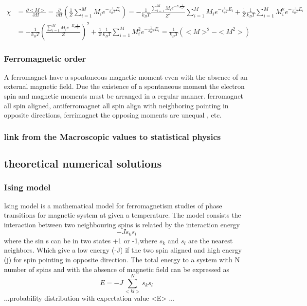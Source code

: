 \documentclass[10pt,a4paper]{article}
\begin{document}
\begin{align}
\chi &=\frac{\partial <M>}{\partial H} = \frac{\partial}{\partial H} \left( \frac{1}{Z }\sum_{i=1}^{M}M_i e ^{ - \frac {1}{k_BT} E_i}\right) = -\frac{1}{k_B T } \frac{\sum_{i=1}^{M} M_i e^{-E_i \frac{1}{k_BT}}}{ Z^2}\sum_{i=1}^{M}M_i e ^{ - \frac {1}{k_BT} E_i} +\frac{1}{Z}\frac{1}{k_BT}\sum_{i=1}^{M}M_i^2 e ^{ - \frac {1}{k_BT} E_i} \\
 &= -\frac{1}{k_B T} \left( \frac{\sum_{i=1}^{M} M_i e^{-E_i \frac{1}{k_BT}}}{ Z} \right)^2 +\frac{1}{Z}\frac{1}{k_BT}\sum_{i=1}^{M}M_i^2 e ^{ - \frac {1}{k_BT} E_i} = \frac{1}{k_B T } \left( <M>^2 - <M^2> \right)
\end{align}


\subsubsection{Ferromagnetic order}

A ferromagnet have a spontaneous magnetic moment even with the absence of an external magnetic field. Due the existence of a spontaneous moment the electron spin and magnetic moments must be arranged in a regular manner.
ferromagnet all spin aligned, antiferromagnet all spin align with neighboring pointing in opposite directions, ferrimagnet the opposing moments are unequal , etc.

\subsubsection{link from the Macroscopic values to statistical physics}
\subsection{theoretical numerical solutions}

\subsubsection{Ising model}
Ising model is a mathematical model for ferromagnetism studies of phase transitions for magnetic system at given a temperature. The model consists the interaction between two neighbouring spins is related by the interaction energy 
\begin{equation}
  -Js_ks_l
\end{equation} 
where the sin s can be in two states +1 or -1,where  $s_k$ and $s_l$ are the nearest neighbors. Which give a low energy (-J) if the two spin aligned and high energy (j) for spin pointing in opposite direction. The total energy to a system with N number of spins and with the absence of magnetic field can be expressed as 
\begin{equation}
  E=-J\sum_{<kl>}^{N}s_ks_l
\end{equation}
...probability distribution with expectation value <E> ...
  
\end{document}
